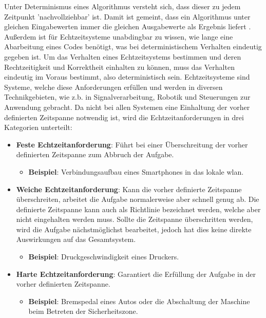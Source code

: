 \documentclass[../EDF Master Thesis.tex]{subfiles}
\begin{document}
Unter Determinismus eines Algorithmus versteht sich, dass dieser zu jedem Zeitpunkt 'nachvollziehbar' ist.
Damit ist gemeint, dass ein Algorithmus unter gleichen Eingabewerten immer die gleichen Ausgabewerte als Ergebnis liefert \autocite{determinismus}.
Außerdem ist für Echtzeitsysteme unabdingbar zu wissen, wie lange eine Abarbeitung eines Codes benötigt, was bei deterministischem Verhalten eindeutig gegeben ist. 
Um das Verhalten eines Echtzeitsystems bestimmen und deren Rechtzeitigkeit und Korrektheit einhalten zu können, muss das Verhalten eindeutig im Voraus bestimmt, also deterministisch sein.
    Echtzeitsysteme sind Systeme, welche diese Anforderungen erfüllen und werden in diversen Technikgebieten, wie z.b. in Signalverarbeitung, Robotik und Steuerungen zur Anwendung gebracht.
    Da nicht bei allen Systemen eine Einhaltung der vorher definierten Zeitspanne notwendig ist, wird die Echtzeitanforderungen in drei Kategorien unterteilt:
    \begin{itemize}
        \item \textbf{Feste Echtzeitanforderung}: Führt bei einer Überschreitung der vorher definierten Zeitspanne zum Abbruch der Aufgabe.
            \begin{itemize}
                \item \textbf{Beispiel}: Verbindungsaufbau eines Smartphones in das lokale \ac{wlan}.
            \end{itemize}
        \item \textbf{Weiche Echtzeitanforderung}: Kann die vorher definierte Zeitspanne überschreiten, arbeitet die Aufgabe normalerweise aber schnell genug ab.
            Die definierte Zeitspanne kann auch als Richtlinie bezeichnet werden, welche aber nicht eingehalten werden muss. 
            Sollte die Zeitspanne überschritten werden, wird die Aufgabe nächstmöglichst bearbeitet, jedoch hat dies keine direkte Auswirkungen auf das Gesamtsystem.
            \begin{itemize}
                \item \textbf{Beispiel}: Druckgeschwindigkeit eines Druckers.
            \end{itemize}
        \item \textbf{Harte Echtzeitanforderung}: Garantiert die Erfüllung der Aufgabe in der vorher definierten Zeitspanne.
        \begin{itemize}
            \item \textbf{Beispiel}: Bremspedal eines Autos oder die Abschaltung der Maschine beim Betreten der Sicherheitszone.
        \end{itemize}
    \end{itemize}
\end{document}

